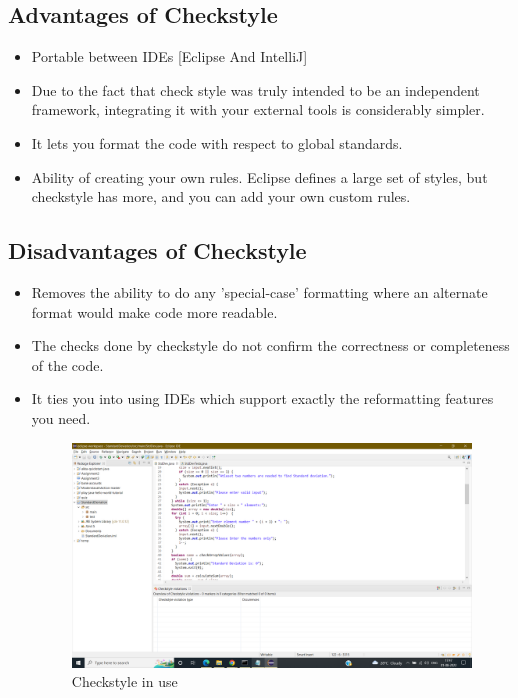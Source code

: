 \documentclass[12pt,a4paper]{report}
\begin{document}
\subsection{Advantages of Checkstyle}
\begin{itemize}
    \item Portable between IDEs [Eclipse And IntelliJ]
    \item Due to the fact that check style was truly intended to be an independent framework, integrating it with your external tools is considerably simpler.
    \item It lets you format the code with respect to global standards. 
    \item Ability of creating your own rules. Eclipse defines a large set of styles, but checkstyle has more, and you can add your own custom rules.

\end{itemize}
\subsection{Disadvantages of Checkstyle}
\begin{itemize}
    \item Removes the ability to do any 'special-case' formatting where an alternate format would make code more readable.
    \item The checks done by checkstyle do not confirm the correctness or completeness of the code.
    \item It ties you into using IDEs which support exactly the reformatting features you need.
    
\begin{figure}[h]
    \centering
    \includegraphics[width=0.87\linewidth]{Images/Checkstyle.png}
    \caption{Checkstyle in use}
    \label{fig:Checkstyle Image}
\end{figure}
\end{itemize}
\end{document}
